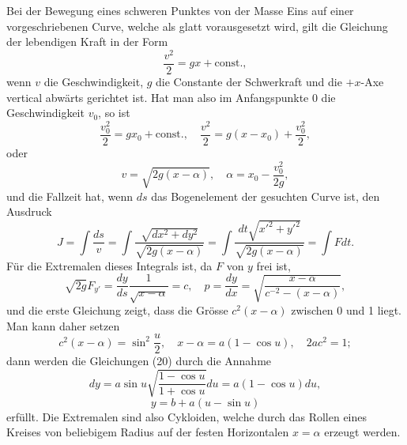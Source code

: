 \documentclass[11pt,a4paper,leqno]{article}
\begin{document}
Bei der Bewegung eines schweren Punktes von der Masse Eins auf einer vorgeschriebenen Curve, welche als glatt vorausgesetzt wird, gilt die Gleichung der lebendigen Kraft in der Form
\[
\frac{v^2}{2}=gx+\mathrm{const.},
\]
wenn $v$ die Geschwindigkeit, $g$ die Constante der Schwerkraft und die $+x$-Axe vertical abwärts gerichtet ist. Hat man also im Anfangspunkte 0 die Geschwindigkeit $v_0$, so ist
\[
\frac{v_0^2}{2}=gx_0+\mathrm{const.},\quad \frac{v^2}{2}=g(x-x_0)+\frac{v_0^2}{2},
\]
oder
\[
v=\sqrt{2g(x-\alpha)},\quad \alpha=x_0-\frac{v_0^2}{2g},
\]
und die Fallzeit hat, wenn $ds$ das Bogenelement der gesuchten Curve ist, den Ausdruck
\[
J=\int\frac{ds}{v}=\int\frac{\sqrt{dx^2+dy^2}}{\sqrt{2g(x-\alpha)}}=\int\frac{dt\sqrt{x'^2+y'^2}}{\sqrt{2g(x-\alpha)}}=\int Fdt.
\]
Für die Extremalen dieses Integrals ist, da $F$ von $y$ frei ist,
\begin{equation}\tag{20}
\sqrt{2g}F_{y'}=\frac{dy}{ds}\frac{1}{\sqrt{x-\alpha}}=c,\quad
p=\frac{dy}{dx}=\sqrt{\frac{x-\alpha}{c^{-2}-(x-\alpha)}},
\end{equation}
und die erste Gleichung zeigt, dass die Grösse $c^2(x-\alpha)$ zwischen 0 und 1 liegt. Man kann daher setzen
\[
c^2(x-\alpha)=\sin^2\frac{u}{2},\quad x-\alpha=a(1-\cos u),\quad 2ac^2=1;
\]
dann werden die Gleichungen (20) durch die Annahme
\[
dy=a\sin u\sqrt{\frac{1-\cos u}{1+\cos u}}du=a(1-\cos u)du,
\]
\[
y=b+a(u-\sin u)
\]
erfüllt.
Die Extremalen sind also Cykloiden, welche durch das Rollen eines Kreises von beliebigem Radius auf der festen Horizontalen $x=\alpha$ erzeugt werden.
\end{document}
